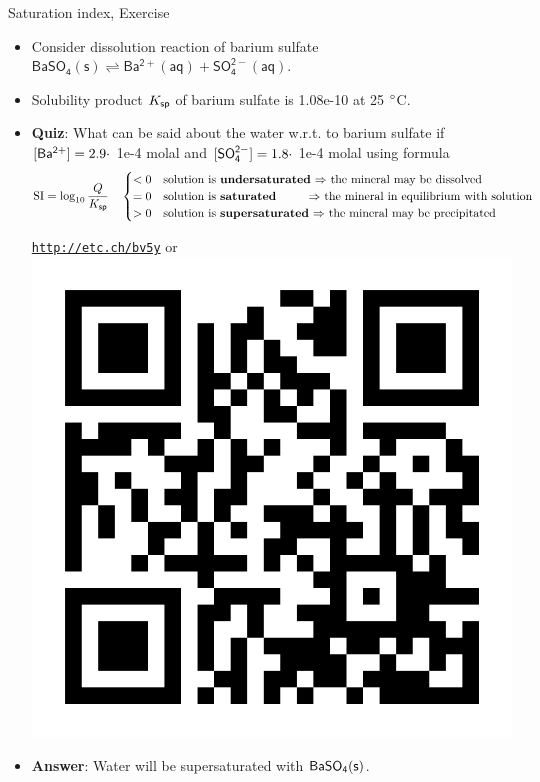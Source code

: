 \begin{frame}{Saturation index, Exercise}
	
%	

	\begin{itemize}
		\item Consider dissolution reaction of barium sulfate 
		$\mathsf{BaSO_4(s) \rightleftharpoons Ba^{2+}(aq) + SO_4^{2-}(aq).}$
		\item Solubility product $K_{\sf sp}$ of barium sulfate is 1.08e-10 at 25 ${\rm ^\circ}$C.
		\item  \alert{\bf Quiz}: What can be said about the water w.r.t. to barium sulfate if
		${\sf [Ba^{2+}}]=2.9 \cdot$ 1e-4 molal and 
		${\sf [SO_4^{2-}]}=1.8 \cdot$ 1e-4 molal
		using formula
		{\footnotesize
		\[
            \mathrm{SI} 
            = \log_{10} \frac{Q}{K_{\sf sp}} \quad 
            \begin{cases}
            < 0& \mbox{solution is \textbf{undersaturated} $\Rightarrow$ the mineral may be dissolved }\\
            = 0& \mbox{solution is \textbf{saturated} \qquad \:\,$\Rightarrow$ the mineral in equilibrium with solution}\\
            > 0 & \mbox{solution is \textbf{supersaturated} $\Rightarrow$ the mineral may be precipitated}
            \end{cases}
        \] 
        }
		\begin{center}
			\href{http://etc.ch/bv5y}{\textcolor{indigo(dye)}{\tt http://etc.ch/bv5y}} 
			\quad
			or 
			\quad
			\includegraphics[height=0.18\columnwidth]{figures/chemical-equilibrium/poll.png}
		\end{center}
		\hiddenpause
		\vskip 5pt
		\item {\bf Answer}: Water will be supersaturated with ${\sf BaSO_4(s)}$.
	\end{itemize}

\end{frame}
